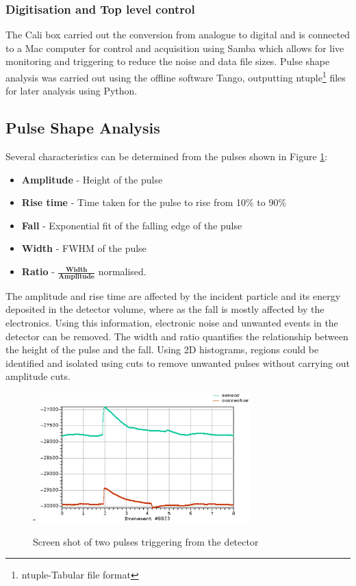 \documentclass[a4paper]{article}
\begin{document}
\subsubsection{Digitisation and Top level control}
The Cali box carried out the conversion from analogue to digital and is connected to a Mac computer for control and acquisition using Samba which allows for live monitoring and triggering to reduce the noise and data file sizes. Pulse shape analysis was carried out using the offline software Tango, outputting ntuple\footnote{ntuple-Tabular file format} files for later analysis using Python.
\subsection{Pulse Shape Analysis} \label{pulse}
Several characteristics can be determined from the pulses shown in Figure \ref{fig:peak}:
\begin{itemize}
    \item {\textbf{Amplitude} - Height of the pulse}
    \item {\textbf{Rise time} - Time taken for the pulse to rise from 10\% to 90\%}
    \item {\textbf{Fall} - Exponential fit of the falling edge of the pulse}
    \item {\textbf{Width} - FWHM of the pulse}
    \item {\textbf{Ratio} - $\frac{\textbf{Width}}{\textbf{Amplitude}}$} normalised.
\end{itemize}
\noindent The amplitude and rise time are affected by the incident particle and its energy deposited in the detector volume, where as the fall is mostly affected by the electronics. Using this information, electronic noise and unwanted events in the detector can be removed. The width and ratio quantifies the relationship between the height of the pulse and the fall.
\newline Using 2D histograms, regions could be identified and isolated using cuts to remove unwanted pulses without carrying out amplitude cuts. 
\begin{figure}[H]-
    \centering
    \includegraphics[height=5cm]{peak.png}
    \caption{Screen shot of two pulses triggering from the detector}
    \label{fig:peak}
\end{figure}
\end{document}
